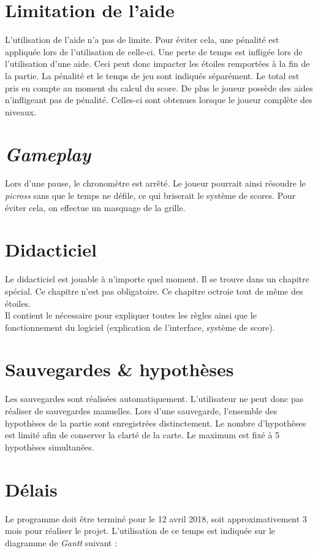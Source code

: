 \documentclass{report}
\begin{document}
	\section{Limitation de l'aide}
		L'utilisation de l'aide n'a pas de limite. Pour éviter cela, une pénalité est appliquée lors de l'utilisation de celle-ci. Une perte de temps est infligée lors de l'utilisation d'une aide. Ceci peut donc impacter les étoiles remportées à la fin de la partie. La pénalité et le temps de jeu sont indiqués séparément. Le total est pris en compte au moment du calcul du score. De plus le joueur possède des aides n'infligeant pas de pénalité. Celles-ci sont obtenues lorsque le joueur complète des niveaux. 
	
	\section{\textit{Gameplay}}
		Lors d'une pause, le chronomètre est arrêté. Le joueur pourrait ainsi résoudre le \textit{picross} sans que le temps ne défile, ce qui briserait le système de scores. Pour éviter cela, on effectue un masquage de la grille.
		
	\section{Didacticiel}
		Le didacticiel est jouable à n'importe quel moment. Il se trouve dans un chapitre spécial. Ce chapitre n'est pas obligatoire. Ce chapitre octroie tout de même des étoiles. \\
		Il contient le nécessaire pour expliquer toutes les règles ainsi que le fonctionnement du logiciel (explication de l'interface, système de score).
	
	\section{Sauvegardes \& hypothèses}
		Les sauvegardes sont réalisées automatiquement. L'utilisateur ne peut donc pas réaliser de sauvegardes manuelles. Lors d'une sauvegarde, l'ensemble des hypothèses de la partie sont enregistrées distinctement. Le nombre d'hypothèses est limité afin de conserver la clarté de la carte. Le maximum est fixé à 5 hypothèses simultanées.
	
	\section{Délais}
		Le programme doit être terminé pour le 12 avril 2018, soit approximativement 3 mois pour réaliser le projet. L'utilisation de ce temps est indiquée sur le diagramme de \textit{Gantt} suivant :
\end{document}
